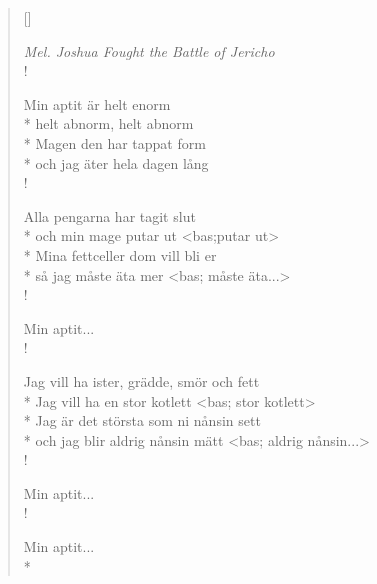 
\settowidth{\versewidth}{Min aptit är helt abnorm}


\begin{verse}[\versewidth]

\flagverse{}
\emph{Mel. Joshua Fought the Battle of Jericho}\\!

Min aptit är helt enorm\\*
helt abnorm, helt abnorm\\*
Magen den har tappat form\\*
och jag äter hela dagen lång\\!

Alla pengarna har tagit slut\\*
och min mage putar ut <bas;putar ut>\\*
Mina fettceller dom vill bli er\\*
så jag måste äta mer <bas; måste äta...>\\!

Min aptit...\\!

Jag vill ha ister, grädde, smör och fett\\*
Jag vill ha en stor kotlett <bas; stor kotlett>\\*
Jag är det största som ni nånsin sett\\*
och jag blir aldrig nånsin mätt <bas; aldrig nånsin...>\\!

Min aptit...\\!

Min aptit...\\*

\end{verse}